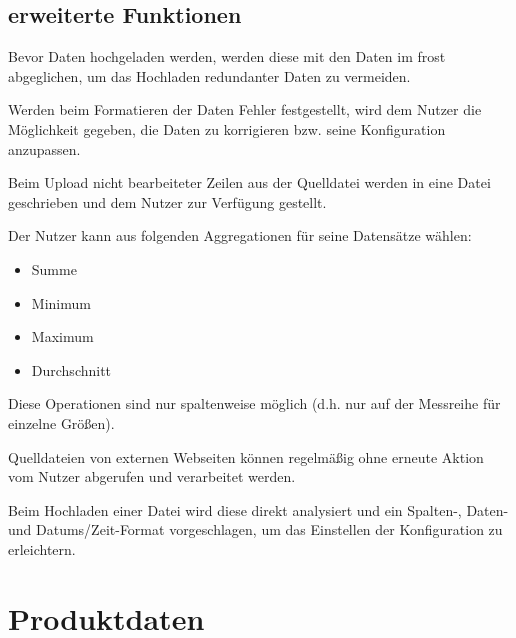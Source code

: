 \documentclass[a4paper, 12 pt]{article}
\begin{document}
	\subsection{erweiterte Funktionen}
	
	
	
	
	Bevor Daten hochgeladen werden, werden diese mit den Daten im \gls{frost} abgeglichen, um das Hochladen redundanter Daten zu vermeiden.
	
	Werden beim Formatieren der Daten Fehler festgestellt, wird dem Nutzer die Möglichkeit gegeben, die Daten zu korrigieren bzw. seine Konfiguration anzupassen.	
	
	Beim Upload nicht bearbeiteter Zeilen aus der Quelldatei werden in eine Datei geschrieben und dem Nutzer zur Verfügung gestellt.
	
	Der Nutzer kann aus folgenden Aggregationen für seine Datensätze wählen:
	\begin{itemize}
			\item Summe
			\item Minimum
			\item Maximum
			\item Durchschnitt
	\end{itemize}
	Diese Operationen sind nur spaltenweise möglich (d.h. nur auf der Messreihe für einzelne Größen).
	
	Quelldateien von externen Webseiten können regelmäßig ohne erneute Aktion vom Nutzer abgerufen und verarbeitet werden.
	
	Beim Hochladen einer Datei wird diese direkt analysiert und ein Spalten-, Daten- und Datums/Zeit-Format vorgeschlagen, um das Einstellen der Konfiguration zu erleichtern.
	
	
	
	
	
	\section{Produktdaten}
	
\end{document}
